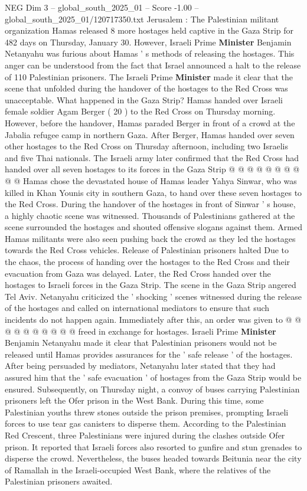 \begin{textsample}{NEG Dim 3 – global\_south\_2025\_01 – Score -1.00 – global\_south\_2025\_01/120717350.txt}  \label{ex:f3_neg_053}
Jerusalem : The Palestinian militant organization Hamas released 8 more hostages held captive in the Gaza Strip for 482 days on Thursday, January 30.
However, Israeli Prime \textbf{Minister} Benjamin Netanyahu was furious about Hamas ' s methods of releasing the hostages.
This anger can be understood from the fact that Israel announced a halt to the release of 110 Palestinian prisoners.
The Israeli Prime \textbf{Minister} made it clear that the scene that unfolded during the handover of the hostages to the Red Cross was unacceptable.
What happened in the Gaza Strip?
Hamas handed over Israeli female soldier Agam Berger ( 20 ) to the Red Cross on Thursday morning.
However, before the handover, Hamas paraded Berger in front of a crowd at the Jabalia refugee camp in northern Gaza.
After Berger, Hamas handed over seven other hostages to the Red Cross on Thursday afternoon, including two Israelis and five Thai nationals.
The Israeli army later confirmed that the Red Cross had handed over all seven hostages to its forces in the Gaza Strip @ @ @ @ @ @ @ @ @ @ Hamas chose the devastated house of Hamas leader Yahya Sinwar, who was killed in Khan Younis city in southern Gaza, to hand over these seven hostages to the Red Cross.
During the handover of the hostages in front of Sinwar ' s house, a highly chaotic scene was witnessed.
Thousands of Palestinians gathered at the scene surrounded the hostages and shouted offensive slogans against them.
Armed Hamas militants were also seen pushing back the crowd as they led the hostages towards the Red Cross vehicles.
Release of Palestinian prisoners halted Due to the chaos, the process of handing over the hostages to the Red Cross and their evacuation from Gaza was delayed.
Later, the Red Cross handed over the hostages to Israeli forces in the Gaza Strip.
The scene in the Gaza Strip angered Tel Aviv.
Netanyahu criticized the ' shocking ' scenes witnessed during the release of the hostages and called on international mediators to ensure that such incidents do not happen again.
Immediately after this, an order was given to @ @ @ @ @ @ @ @ @ @ freed in exchange for hostages.
Israeli Prime \textbf{Minister} Benjamin Netanyahu made it clear that Palestinian prisoners would not be released until Hamas provides assurances for the ' safe release ' of the hostages.
After being persuaded by mediators, Netanyahu later stated that they had assured him that the ' safe evacuation ' of hostages from the Gaza Strip would be ensured.
Subsequently, on Thursday night, a convoy of buses carrying Palestinian prisoners left the Ofer prison in the West Bank.
During this time, some Palestinian youths threw stones outside the prison premises, prompting Israeli forces to use tear gas canisters to disperse them.
According to the Palestinian Red Crescent, three Palestinians were injured during the clashes outside Ofer prison.
It reported that Israeli forces also resorted to gunfire and stun grenades to disperse the crowd.
Nevertheless, the buses headed towards Beitunia near the city of Ramallah in the Israeli-occupied West Bank, where the relatives of the Palestinian prisoners awaited.

\end{textsample}
